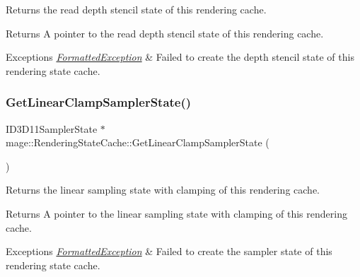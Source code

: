 Returns the read depth stencil state of this rendering cache.

\begin{DoxyReturn}{Returns}
A pointer to the read depth stencil state of this rendering cache. 
\end{DoxyReturn}

\begin{DoxyExceptions}{Exceptions}
{\em \hyperlink{structmage_1_1_formatted_exception}{Formatted\+Exception}} & Failed to create the depth stencil state of this rendering state cache. \\
\hline
\end{DoxyExceptions}
\hypertarget{structmage_1_1_rendering_state_cache_a8fd935f6eaca18ee85eef482c4b0acf8}{}\label{structmage_1_1_rendering_state_cache_a8fd935f6eaca18ee85eef482c4b0acf8} 
\subsubsection{\texorpdfstring{Get\+Linear\+Clamp\+Sampler\+State()}{GetLinearClampSamplerState()}}
{\footnotesize\ttfamily I\+D3\+D11\+Sampler\+State $\ast$ mage\+::\+Rendering\+State\+Cache\+::\+Get\+Linear\+Clamp\+Sampler\+State (\begin{DoxyParamCaption}{ }\end{DoxyParamCaption})}

Returns the linear sampling state with clamping of this rendering cache.

\begin{DoxyReturn}{Returns}
A pointer to the linear sampling state with clamping of this rendering cache. 
\end{DoxyReturn}

\begin{DoxyExceptions}{Exceptions}
{\em \hyperlink{structmage_1_1_formatted_exception}{Formatted\+Exception}} & Failed to create the sampler state of this rendering state cache. \\
\hline
\end{DoxyExceptions}
\hypertarget{structmage_1_1_rendering_state_cache_abcd4b98f9c0170466551901845c86824}{}\label{structmage_1_1_rendering_state_cache_abcd4b98f9c0170466551901845c86824} 
